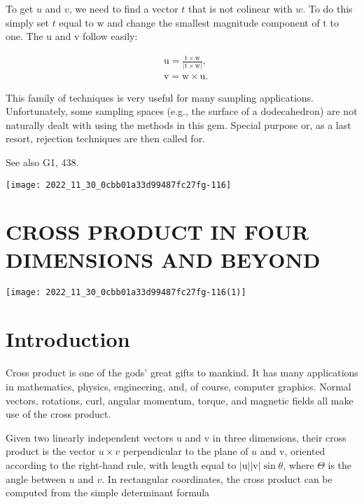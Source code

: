 \begin{CJK}{UTF8}{gbsn}
To get $u$ and $v$, we need to find a vector $t$ that is not colinear with $w$. To do this simply set $t$ equal to $\mathrm{w}$ and change the smallest magnitude component of $\mathrm{t}$ to one. The $\mathrm{u}$ and $\mathrm{v}$ follow easily:

$$
\begin{aligned}
&\mathrm{u}=\frac{\mathrm{t} \times \mathrm{w}}{|\mathrm{t} \times \mathrm{w}|}, \\
&\mathrm{v}=\mathrm{w} \times \mathrm{u} .
\end{aligned}
$$

This family of techniques is very useful for many sampling applications. Unfortunately, some sampling spaces (e.g., the surface of a dodecahedron) are not naturally dealt with using the methods in this gem. Special purpose or, as a last resort, rejection techniques are then called for.

See also G1, 438.

\begin{center}
\texttt{[image: 2022\_11\_30\_0cbb01a33d99487fc27fg-116]}
\end{center}

\section{CROSS PRODUCT IN FOUR DIMENSIONS AND BEYOND}
\begin{center}
\texttt{[image: 2022\_11\_30\_0cbb01a33d99487fc27fg-116(1)]}
\end{center}

\section{Introduction}
Cross product is one of the gods' great gifts to mankind. It has many applications in mathematics, physics, engineering, and, of course, computer graphics. Normal vectors, rotations, curl, angular momentum, torque, and magnetic fields all make use of the cross product.

Given two linearly independent vectors $\mathrm{u}$ and $\mathrm{v}$ in three dimensions, their cross product is the vector $u \times v$ perpendicular to the plane of $u$ and $\mathrm{v}$, oriented according to the right-hand rule, with length equal to $|\mathrm{u}||\mathrm{v}| \sin \theta$, where $\Theta$ is the angle between $u$ and $v$. In rectangular coordinates, the cross product can be computed from the simple determinant formula


\end{CJK}
